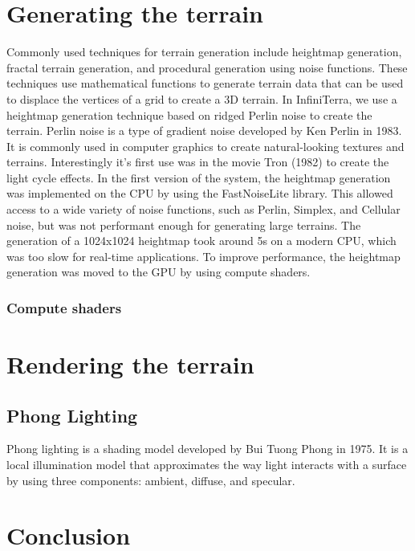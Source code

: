 \documentclass{report}
\begin{document}


\chapter{Generating the terrain}
\label{ch:generating-the-terrain}
Commonly used techniques for terrain generation include heightmap generation, fractal terrain generation, and procedural generation using noise functions.
These techniques use mathematical functions to generate terrain data that can be used to displace the vertices of a grid to create a 3D terrain.
In InfiniTerra, we use a heightmap generation technique based on ridged Perlin noise to create the terrain.
Perlin noise is a type of gradient noise developed by Ken Perlin in 1983. It is commonly used in computer graphics to create natural-looking textures and terrains.
Interestingly it's first use was in the movie Tron (1982) to create the light cycle effects.
In the first version of the system, the heightmap generation was implemented on the CPU by using the FastNoiseLite library.
This allowed access to a wide variety of noise functions, such as Perlin, Simplex, and Cellular noise, but was not performant enough for generating large terrains.
The generation of a 1024x1024 heightmap took around 5s on a modern CPU, which was too slow for real-time applications.
To improve performance, the heightmap generation was moved to the GPU by using compute shaders.

\subsection*{Compute shaders}

\chapter{Rendering the terrain}
\label{ch:rendering-the-terrain}
\section{Phong Lighting}
Phong lighting is a shading model developed by Bui Tuong Phong in 1975. It is a local illumination model that approximates the way light interacts with a surface by using three components: ambient, diffuse, and specular.
\lipsum[3-4]

\chapter{Conclusion}
\label{ch:conclusion}
\lipsum[7-8]



\end{document}
